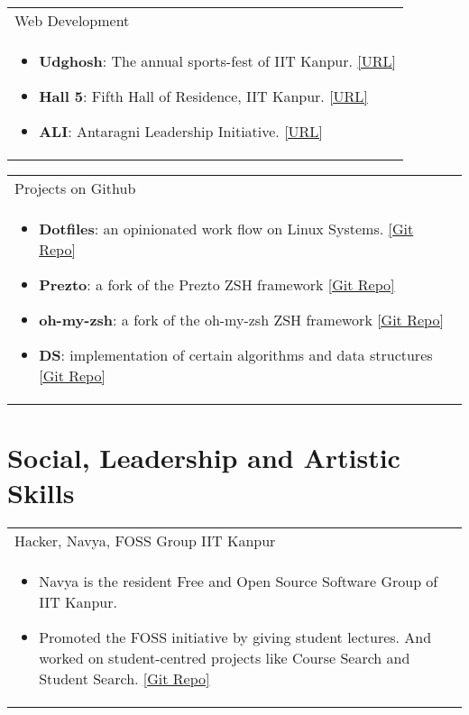 \documentclass[a4paper,10pt]{article} %
\newcommand{\projectlist}[2]{
    \begin{tabular}{p{\linewidth}}
        \textcolor{NavyBlue}{#1}\\
        \vspace{-0.3cm}
        \footnotesize{#2}
    \end{tabular}
    \vspace{-0.4cm}
}
\begin{document}
\projectlist {Web Development}
             {
                 \begin{itemize}[leftmargin=0.5cm]
                     \item \textbf{Udghosh}: The annual sports-fest of IIT Kanpur.
                         \href{www.udghosh.org} {[URL]}
                     \item \textbf{Hall 5}: Fifth Hall of Residence, IIT Kanpur.
                         \href{http://www.iitk.ac.in/hall5} {[URL]}
                     \item \textbf{ALI}: Antaragni Leadership Initiative.
                         \href{www.antargni.in/ali} {[URL]}
                 \end{itemize}
             }

\projectlist {Projects on Github}
             {
                 \begin{itemize}[leftmargin=0.5cm]
                     \item \textbf{Dotfiles}: an opinionated work flow on Linux Systems.
                         \href{https://github.com/srijanshetty/dotfiles} {[Git Repo]}
                     \item \textbf{Prezto}: a fork of the Prezto ZSH framework
                         \href{https://github.com/srijanshetty/prezto} {[Git Repo]}
                     \item \textbf{oh-my-zsh}: a fork of the oh-my-zsh ZSH framework
                         \href{https://github.com/srijanshetty/oh-my-zsh} {[Git Repo]}
                     \item \textbf{DS}: implementation of certain algorithms and data structures
                         \href{https://github.com/srijanshetty/DS} {[Git Repo]}
                 \end{itemize}
             }



\section {Social, Leadership and Artistic Skills}

\projectlist {Hacker, Navya, FOSS Group IIT Kanpur}
             {
                   \begin{itemize}[leftmargin=0.5cm]
                       \item Navya is the resident Free and Open Source Software Group of IIT Kanpur.
                       \item Promoted the FOSS initiative by giving student lectures.
                           And worked on student-centred projects like Course Search and Student Search.
                           \href{https://github.com/navya} {[Git Repo]}
                   \end{itemize}
             }
\end{document}

